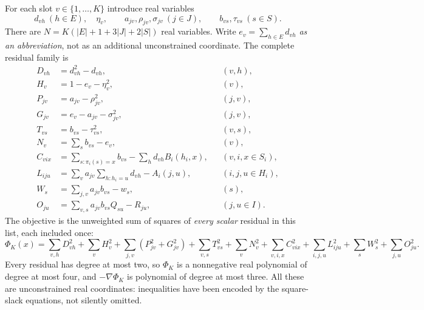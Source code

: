 For each slot $v\in\{1,\ldots,K\}$ introduce real variables
\[
 d_{vh}\ (h\in E),\quad \eta_v,\qquad
 a_{jv},\rho_{jv},\sigma_{jv}\ (j\in J),\qquad
 b_{vs},\tau_{vs}\ (s\in S).
\]
There are $N=K(|E|+1+3|J|+2|S|)$ real variables. Write
$e_v=\sum_{h\in E}d_{vh}$ \emph{as an abbreviation}, not as an additional
unconstrained coordinate. The complete residual family is
\begin{align}
 D_{vh}&=d_{vh}^2-d_{vh}, &&(v,h),\label{eq:poly-selector}\\
 H_v&=1-e_v-\eta_v^2, &&(v),\label{eq:poly-cap}\\
 P_{jv}&=a_{jv}-\rho_{jv}^2, &&(j,v),\label{eq:poly-root-positive}\\
 G_{jv}&=e_v-a_{jv}-\sigma_{jv}^2, &&(j,v),\label{eq:poly-root-gate}\\
 T_{vs}&=b_{vs}-\tau_{vs}^2, &&(v,s),\label{eq:poly-row-positive}\\
 N_v&=\sum_sb_{vs}-e_v, &&(v),\label{eq:poly-row-normalization}\\
 C_{vix}&=\sum_{s:\pi_i(s)=x}b_{vs}
             -\sum_hd_{vh}B_i(h_i,x), &&(v,i,x\in S_i),\label{eq:poly-row-marginal}\\
 L_{iju}&=\sum_va_{jv}\sum_{h:h_i=u}d_{vh}-A_i(j,u),
             &&(i,j,u\in H_i),\label{eq:poly-local-root}\\
 W_s&=\sum_{j,v}a_{jv}b_{vs}-w_s, &&(s),\label{eq:poly-retained}\\
 O_{ju}&=\sum_{v,s}a_{jv}b_{vs}Q_{su}-R_{ju}, &&(j,u\in I).
             \label{eq:poly-observed}
\end{align}
The objective is the unweighted sum of squares of \emph{every scalar}
residual in this list, each included once:
\begin{equation}\label{eq:poly-objective}
 \Phi_K(x)=\sum_{v,h}D_{vh}^2+\sum_vH_v^2
 +\sum_{j,v}(P_{jv}^2+G_{jv}^2)+\sum_{v,s}T_{vs}^2
 +\sum_vN_v^2+\sum_{v,i,x}C_{vix}^2
 +\sum_{i,j,u}L_{iju}^2+\sum_sW_s^2+\sum_{j,u}O_{ju}^2.
\end{equation}
Every residual has degree at most two, so $\Phi_K$ is a nonnegative real
polynomial of degree at most four, and $-\nabla\Phi_K$ is polynomial of degree
at most three. All these are unconstrained real coordinates: inequalities
have been encoded by the square-slack equations, not silently omitted.

